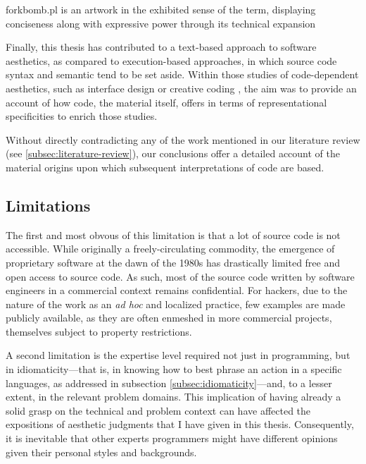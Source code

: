 \begin{listing}
    \inputminted{perl}{./corpus/forkbomb.pl}
    \caption[]{forkbomb.pl is an artwork in the exhibited sense of the term, displaying conciseness along with expressive power through its technical expansion}
    \label{code:forkbomb}
\end{listing}

Finally, this thesis has contributed to a text-based approach to software aesthetics, as compared to execution-based approaches, in which source code syntax and semantic tend to be set aside. Within those studies of code-dependent aesthetics, such as interface design \citep{fishwick_aesthetic_2001} or creative coding \citep{cox_aesthetic_2020}, the aim was to provide an account of how code, the material itself, offers in terms of representational specificities to enrich those studies.

Without directly contradicting any of the work mentioned in our literature review (see \ref{subsec:literature-review}), our conclusions offer a detailed account of the material origins upon which subsequent interpretations of code are based.

\subsection{Limitations}

The first and most obvous of this limitation is that a lot of source code is not accessible. While originally a freely-circulating commodity, the emergence of proprietary software at the dawn of the 1980s \citep{hassett_impact_2012} has drastically limited free and open access to source code. As such, most of the source code written by software engineers in a commercial context remains confidential. For hackers, due to the nature of the work as an \emph{ad hoc} and localized practice, few examples are made publicly available, as they are often enmeshed in more commercial projects, themselves subject to property restrictions.


A second limitation is the expertise level required not just in programming, but in idiomaticity—that is, in knowing how to best phrase an action in a specific languages, as addressed in subsection \ref{subsec:idiomaticity}—and, to a lesser extent, in the relevant problem domains. This implication of having already a solid grasp on the technical and problem context can have affected the expositions of aesthetic judgments that I have given in this thesis. Consequently, it is inevitable that other experts programmers might have different opinions given their personal styles and backgrounds.

